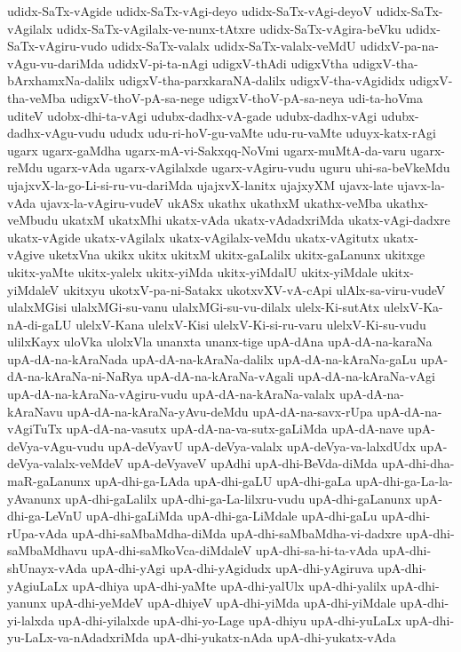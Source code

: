 {udidx-SaTx-vAgide
udidx-SaTx-vAgi-deyo
udidx-SaTx-vAgi-deyoV
udidx-SaTx-vAgilalx
udidx-SaTx-vAgilalx-ve-nunx-tAtxre
udidx-SaTx-vAgira-beVku
udidx-SaTx-vAgiru-vudo
udidx-SaTx-valalx
udidx-SaTx-valalx-veMdU
udidxV-pa-na-vAgu-vu-dariMda
udidxV-pi-ta-nAgi
udigxV-thAdi
udigxVtha
udigxV-tha-bArxhamxNa-dalilx
udigxV-tha-parxkaraNA-dalilx
udigxV-tha-vAgididx
udigxV-tha-veMba
udigxV-thoV-pA-sa-nege
udigxV-thoV-pA-sa-neya
udi-ta-hoVma
uditeV
udobx-dhi-ta-vAgi
udubx-dadhx-vA-gade
udubx-dadhx-vAgi
udubx-dadhx-vAgu-vudu
ududx
udu-ri-hoV-gu-vaMte
udu-ru-vaMte
uduyx-katx-rAgi
ugarx
ugarx-gaMdha
ugarx-mA-vi-Sakxqq-NoVmi
ugarx-muMtA-da-varu
ugarx-reMdu
ugarx-vAda
ugarx-vAgilalxde
ugarx-vAgiru-vudu
uguru
uhi-sa-beVkeMdu
ujajxvX-la-go-Li-si-ru-vu-dariMda
ujajxvX-lanitx
ujajxyXM
ujavx-late
ujavx-la-vAda
ujavx-la-vAgiru-vudeV
ukASx
ukathx
ukathxM
ukathx-veMba
ukathx-veMbudu
ukatxM
ukatxMhi
ukatx-vAda
ukatx-vAdadxriMda
ukatx-vAgi-dadxre
ukatx-vAgide
ukatx-vAgilalx
ukatx-vAgilalx-veMdu
ukatx-vAgitutx
ukatx-vAgive
uketxVna
ukikx
ukitx
ukitxM
ukitx-gaLalilx
ukitx-gaLanunx
ukitxge
ukitx-yaMte
ukitx-yalelx
ukitx-yiMda
ukitx-yiMdalU
ukitx-yiMdale
ukitx-yiMdaleV
ukitxyu
ukotxV-pa-ni-Satakx
ukotxvXV-vA-cApi
ulAlx-sa-viru-vudeV
ulalxMGisi
ulalxMGi-su-vanu
ulalxMGi-su-vu-dilalx
ulelx-Ki-sutAtx
ulelxV-Ka-nA-di-gaLU
ulelxV-Kana
ulelxV-Kisi
ulelxV-Ki-si-ru-varu
ulelxV-Ki-su-vudu
ulilxKayx
uloVka
ulolxVla
unanxta
unanx-tige
upA-dAna
upA-dA-na-karaNa
upA-dA-na-kAraNada
upA-dA-na-kAraNa-dalilx
upA-dA-na-kAraNa-gaLu
upA-dA-na-kAraNa-ni-NaRya
upA-dA-na-kAraNa-vAgali
upA-dA-na-kAraNa-vAgi
upA-dA-na-kAraNa-vAgiru-vudu
upA-dA-na-kAraNa-valalx
upA-dA-na-kAraNavu
upA-dA-na-kAraNa-yAvu-deMdu
upA-dA-na-savx-rUpa
upA-dA-na-vAgiTuTx
upA-dA-na-vasutx
upA-dA-na-va-sutx-gaLiMda
upA-dA-nave
upA-deVya-vAgu-vudu
upA-deVyavU
upA-deVya-valalx
upA-deVya-va-lalxdUdx
upA-deVya-valalx-veMdeV
upA-deVyaveV
upAdhi
upA-dhi-BeVda-diMda
upA-dhi-dha-maR-gaLanunx
upA-dhi-ga-LAda
upA-dhi-gaLU
upA-dhi-gaLa
upA-dhi-ga-La-la-yAvanunx
upA-dhi-gaLalilx
upA-dhi-ga-La-lilxru-vudu
upA-dhi-gaLanunx
upA-dhi-ga-LeVnU
upA-dhi-gaLiMda
upA-dhi-ga-LiMdale
upA-dhi-gaLu
upA-dhi-rUpa-vAda
upA-dhi-saMbaMdha-diMda
upA-dhi-saMbaMdha-vi-dadxre
upA-dhi-saMbaMdhavu
upA-dhi-saMkoVca-diMdaleV
upA-dhi-sa-hi-ta-vAda
upA-dhi-shUnayx-vAda
upA-dhi-yAgi
upA-dhi-yAgidudx
upA-dhi-yAgiruva
upA-dhi-yAgiuLaLx
upA-dhiya
upA-dhi-yaMte
upA-dhi-yalUlx
upA-dhi-yalilx
upA-dhi-yanunx
upA-dhi-yeMdeV
upA-dhiyeV
upA-dhi-yiMda
upA-dhi-yiMdale
upA-dhi-yi-lalxda
upA-dhi-yilalxde
upA-dhi-yo-Lage
upA-dhiyu
upA-dhi-yuLaLx
upA-dhi-yu-LaLx-va-nAdadxriMda
upA-dhi-yukatx-nAda
upA-dhi-yukatx-vAda
}

